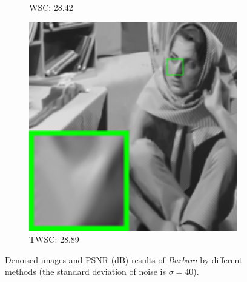 \begin{figure}
\begin{adjustwidth}{-2cm}{}
\begin{subfigure}[t]{0.19\textwidth}
		\caption{WSC: 28.42}
    \end{subfigure}
    \hfill
    \begin{subfigure}[t]{0.19\textwidth}
        \centering
        \includegraphics[width=1\textwidth]{images/twsc/awgn/resize_br_WLSWSC_40_barbara.png}
		\caption{TWSC: 28.89}
    \end{subfigure}
    \caption{Denoised images and PSNR (dB) results of \textsl{Barbara} by different methods (the standard deviation of noise is $\sigma=40$).}
    \label{fig5-3}
\end{adjustwidth}
\end{figure}


